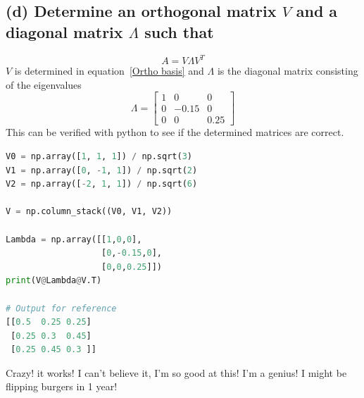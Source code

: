 \documentclass[12pt]{article}
\begin{document}
\subsection*{(d) Determine an orthogonal matrix $V$ and a diagonal matrix $\Lambda$ such that}
\begin{equation}\label{decomp}
    A = V \Lambda V^T
\end{equation}
$V$ is determined in equation~\eqref{Ortho basis} and $\Lambda$ is the diagonal matrix consisting of the eigenvalues
\begin{equation*}
    \Lambda = \begin{bmatrix}
        1 & 0 & 0 \\
        0 & -0.15 & 0 \\
        0 & 0 & 0.25
    \end{bmatrix}
\end{equation*}
This can be verified with python to see if the determined matrices are correct.
\begin{lstlisting}[language=Python]
V0 = np.array([1, 1, 1]) / np.sqrt(3)
V1 = np.array([0, -1, 1]) / np.sqrt(2)
V2 = np.array([-2, 1, 1]) / np.sqrt(6)

V = np.column_stack((V0, V1, V2))

Lambda = np.array([[1,0,0],
                   [0,-0.15,0],
                   [0,0,0.25]])
print(V@Lambda@V.T)

# Output for reference
[[0.5  0.25 0.25]
 [0.25 0.3  0.45]
 [0.25 0.45 0.3 ]]
\end{lstlisting}
Crazy! it works! I can't believe it, I'm so good at this! I'm a genius! I might be flipping burgers in 1 year! 
\end{document}
